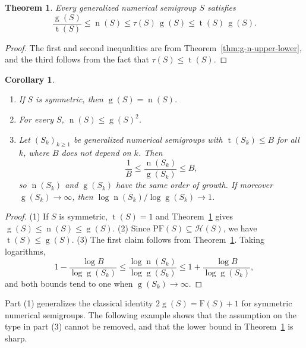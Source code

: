 \documentclass[12pt]{amsart}
\theoremstyle{plain}
\theoremstyle{theorem}
\newtheorem{theorem}[definition]{Theorem}
\newtheorem{corollary}[definition]{Corollary}
\theoremstyle{remark}
\begin{document}
\begin{theorem}\label{thm:sandwich}
Every generalized numerical semigroup $S$ satisfies
\[
\frac{\operatorname{g}(S)}{\operatorname{t}(S)}\leq \operatorname{n}(S)\leq\tau(S)\,\operatorname{g}(S)\leq \operatorname{t}(S)\,\operatorname{g}(S).
\]
\end{theorem}

\begin{proof}
The first and second inequalities are from Theorem~\ref{thm:g-n-upper-lower}, and the third follows from the fact that $\tau(S) \leq \operatorname{t}(S)$.
\end{proof}

\begin{corollary}\label{cor:growth}
\begin{enumerate}
\item If $S$ is symmetric, then $\operatorname{g}(S)=\operatorname{n}(S)$.
\item For every $S$, $\operatorname{n}(S)\leq \operatorname{g}(S)^2$.
\item Let $(S_k)_{k\ge1}$ be generalized numerical semigroups with $\operatorname{t}(S_k)\le B$ for all $k$, where $B$ does not depend on $k$. Then
\[
\frac1B\leq\frac{\operatorname{n}(S_k)}{\operatorname{g}(S_k)}\le B,
\]
so $\operatorname{n}(S_k)$ and $\operatorname{g}(S_k)$ have the same order of growth. If moreover $\operatorname{g}(S_k)\to\infty$, then $\log \operatorname{n}(S_k)/\log\operatorname{g}(S_k)\to1$.
\end{enumerate}
\end{corollary}

\begin{proof}
(1) If $S$ is symmetric, $\operatorname{t}(S)=1$ and Theorem~\ref{thm:sandwich} gives $\operatorname{g}(S)\leq \operatorname{n}(S)\le \operatorname{g}(S)$. (2) Since $\mathrm{PF}(S)\subseteq \mathcal{H}(S)$, we have $\operatorname{t}(S)\leq \operatorname{g}(S)$. (3) The first claim follows from Theorem~\ref{thm:sandwich}. Taking logarithms,
\[
1-\frac{\log B}{\log \operatorname{g}(S_k)}\leq \frac{\log \operatorname{n}(S_k)}{\log \operatorname{g}(S_k)}\le1+\frac{\log B}{\log \operatorname{g}(S_k)},
\]
and both bounds tend to one when $\operatorname{g}(S_k)\to\infty$.
\end{proof}

Part (1) generalizes the classical identity $2\operatorname{g}(S)=\mathrm{F}(S)+1$ for symmetric numerical semigroups. The following example shows that the assumption on the type in part (3) cannot be removed, and that the lower bound in Theorem~\ref{thm:sandwich} is sharp.
\end{document}
